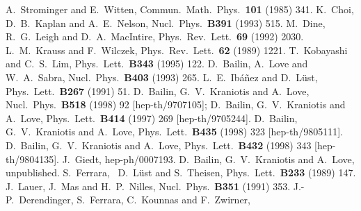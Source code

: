 \documentclass[a4paper,12pt]{article}
\begin{document}
\begin{thebibliography}{99}
	A.~Strominger and E.~Witten,
	Commun.\ Math.\ Phys.\ {\bf 101} (1985) 341.
	K.~Choi, D.~B.~Kaplan and A.~E.~Nelson,
	Nucl.\ Phys.\ {\bf B391} (1993) 515.
	M.~Dine, R.~G.~Leigh and D.~A.~MacIntire,
	Phys.\ Rev.\ Lett.\ {\bf 69} (1992) 2030.
	L.~M.~Krauss and F.~Wilczek,
	Phys.\ Rev.\ Lett.\ {\bf 62} (1989) 1221.
	T.~Kobayashi and C.~S.~Lim,
	Phys.\ Lett.\ {\bf B343} (1995) 122.
	D.~Bailin, A.~Love and W.~A.~Sabra,
	Nucl.\ Phys.\ {\bf B403} (1993) 265.
	L.~E.~Ib\'a\~nez and D.~L\"ust,
	Phys.\ Lett.\ {\bf B267} (1991) 51.
	D.~Bailin, G.~V.~Kraniotis and A.~Love,
	Nucl.\ Phys.\ {\bf B518} (1998) 92 [hep-th/9707105]; 
	D.~Bailin, G.~V.~Kraniotis and A.~Love,
	Phys.\ Lett.\ {\bf B414} (1997) 269 [hep-th/9705244].
	D.~Bailin, G.~V.~Kraniotis and A.~Love,
	Phys.\ Lett.\ {\bf B435} (1998) 323 [hep-th/9805111].
	D.~Bailin, G.~V.~Kraniotis and A.~Love,
	Phys.\ Lett.\ {\bf B432} (1998) 343 [hep-th/9804135].
	J.~Giedt,
	hep-ph/0007193.
	D.~Bailin, G.~V.~Kraniotis and A.~Love, unpublished.
	S.~Ferrara, ~D.~L\"ust and S.~Theisen,
	Phys.\ Lett.\ {\bf B233} (1989) 147.
	J.~Lauer, J.~Mas and H.~P.~Nilles,
	Nucl.\ Phys.\ {\bf B351} (1991) 353.
	J.-P.~Derendinger, S.~Ferrara, C.~Kounnas and F.~Zwirner,

\end{thebibliography}
\end{document}
